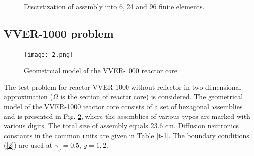 \documentclass[authoryear]{elsarticle}
\begin{document}
\begin{figure}[h]
  \begin{center}
\begin{minipage}{0.30\linewidth}
\\
\end{minipage}
\hfill
\begin{minipage}{0.30\linewidth}
\\
\end{minipage}
\hfill
\begin{minipage}{0.30\linewidth}
\\
\end{minipage}
\caption{Discretization of assembly into 6, 24 and 96 finite elements.}
\label{fig:1}
  \end{center}
\end{figure}

\subsection{VVER-1000 problem} 
\begin{figure}[h]
  \begin{center}
    \texttt{[image: 2.png]}
	\caption{Geometrcial model of the VVER-1000 reactor core}
	\label{fig:2}
  \end{center}
\end{figure} 

The test problem for reactor VVER-1000 without reflector   \cite{chao} in two-dimensional approximation 
($\Omega$ is the section of reactor core) is considered. 
The geometrical model of the VVER-1000 reactor core consists of a set of hexagonal assemblies and is presented in Fig. \ref{fig:2}, where the assemblies of various types are marked with various digits. The total size of assembly equals 23.6 cm. Diffusion neutronics constants in the common units are given in Table \ref{t-1}. 
The boundary conditions (\ref{2}) are used at $\gamma_g = 0.5, \ g = 1,2$. 
\end{document}
